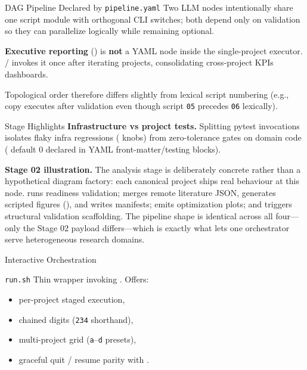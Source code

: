 \documentclass[
  ignorenonframetext,
]{beamer}
\providecommand{\tightlist}{%
  \setlength{\itemsep}{0pt}\setlength{\parskip}{0pt}}
\begin{document}
\begin{frame}{DAG Pipeline Declared by
\texttt{pipeline.yaml}}
Two LLM nodes intentionally share one script module with orthogonal CLI
switches; both depend only on validation so they can parallelize
logically while remaining optional.

\textbf{Executive reporting}
() is \textbf{not} a
YAML node inside the single-project executor. 
/  invokes it once after iterating
projects, consolidating cross-project KPIs dashboards.

Topological order therefore differs slightly from lexical script
numbering (e.g., copy executes after validation even though script
\texttt{05} precedes \texttt{06} lexically).

\begin{block}{Stage Highlights}
\protect{}\label{stage-highlights}
\textbf{Infrastructure vs project tests.} Splitting pytest invocations
isolates flaky infra regressions ( knobs)
from zero-tolerance gates on domain code
( default 0 declared in YAML
front-matter/testing blocks).

\textbf{Stage 02 illustration.} The analysis stage is deliberately
concrete rather than a hypothetical diagram factory: each canonical
project ships real behaviour at this node.
 runs readiness validation;
 merges remote literature JSON,
generates scripted figures (),
and writes manifests;  emits
optimization plots; and  triggers
structural validation scaffolding. The pipeline shape is identical
across all four---only the Stage 02 payload differs---which is exactly
what lets one orchestrator serve heterogeneous research domains.
\end{block}

\begin{block}{Interactive Orchestration}
\protect{}\label{interactive-orchestration}
\begin{block}{\texttt{run.sh}}
\protect{}\label{run.sh}
Thin wrapper invoking .
Offers:

\begin{itemize}
\tightlist
\item
  per-project staged execution,
\item
  chained digits (\texttt{234} shorthand),
\item
  multi-project grid (\texttt{a}--\texttt{d} presets),
\item
  graceful quit / resume parity with .
\end{itemize}


\end{block}
\end{block}
\end{frame}
\end{document}

